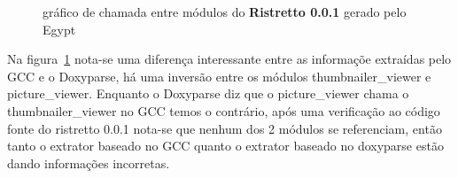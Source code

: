 \begin{figure}
\center
{}
\qquad
{}
\caption{gráfico de chamada entre módulos do {\bf Ristretto 0.0.1} gerado pelo Egypt}
\label{ristretto-0.0.1}
\end{figure}

Na figura~\ref{ristretto-0.0.1} nota-se uma diferença interessante entre as
informaçõe extraídas pelo GCC e o Doxyparse, há uma inversão entre os módulos
thumbnailer\_viewer e picture\_viewer. Enquanto o Doxyparse diz que o
picture\_viewer chama o thumbnailer\_viewer no GCC temos o contrário, após uma
verificação ao código fonte do ristretto 0.0.1 nota-se que nenhum dos 2 módulos
se referenciam, então tanto o extrator baseado no GCC quanto o
extrator baseado no doxyparse estão dando informações incorretas.

